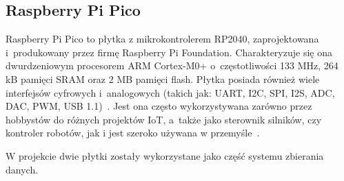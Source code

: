 \subsection{Raspberry Pi Pico}

Raspberry Pi Pico to płytka z mikrokontrolerem RP2040, zaprojektowana i~produkowany przez firmę Raspberry Pi Foundation.
Charakteryzuje się ona dwurdzeniowym procesorem ARM Cortex-M0+ o~częstotliwości 133 MHz, 264 kB pamięci SRAM oraz 2 MB pamięci flash.
Płytka posiada również wiele interfejsów cyfrowych i~analogowych (takich jak: UART, I2C, SPI, I2S, ADC, DAC, PWM, USB 1.1)~\cite{PICO:datasheet}.
Jest ona często wykorzystywana zarówno przez hobbystów do różnych projektów IoT, a~także jako sterownik silników, czy kontroler robotów, jak i jest szeroko używana w przemyśle~\cite{PICO:doc}.

W projekcie dwie płytki zostały wykorzystane jako część systemu zbierania danych.


